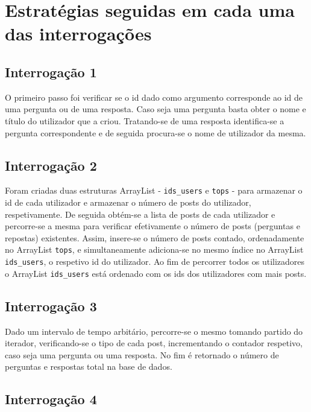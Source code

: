 \documentclass[4apaper]{report}
\begin{document}
\newpage
\section{Estratégias seguidas em cada uma das interrogações}

\label{sec:estrategiasSeguidasEmCadaUmaDasInterrogacoes}

\subsection{Interrogação 1}

O primeiro passo foi verificar se o id dado como argumento corresponde ao id de uma pergunta ou de uma resposta. Caso seja uma pergunta basta obter o nome e título do utilizador que a criou. Tratando-se de uma resposta identifica-se a pergunta correspondente e de seguida procura-se o nome de utilizador da mesma.

\subsection{Interrogação 2}

Foram criadas duas estruturas ArrayList - \texttt{ids\_users} e \texttt{tops} - para armazenar o id de cada utilizador e armazenar o número de posts do utilizador, respetivamente. De seguida obtém-se a lista de posts de cada utilizador e percorre-se a mesma para verificar efetivamente o número de posts (perguntas e repostas) existentes. Assim, insere-se o número de posts contado, ordenadamente no ArrayList \texttt{tops}, e simultaneamente adiciona-se no mesmo índice no ArrayList \texttt{ids\_users}, o respetivo id do utilizador. Ao fim de percorrer todos os utilizadores o ArrayList \texttt{ids\_users} está ordenado com os ids dos utilizadores com mais posts.

\subsection{Interrogação 3}

Dado um intervalo de tempo arbitário, percorre-se o mesmo tomando partido do iterador, verificando-se o tipo de cada post, incrementando o contador respetivo, caso seja uma pergunta ou uma resposta. No fim é retornado o número de perguntas e respostas total na base de dados. 

\subsection{Interrogação 4}
\end{document}
